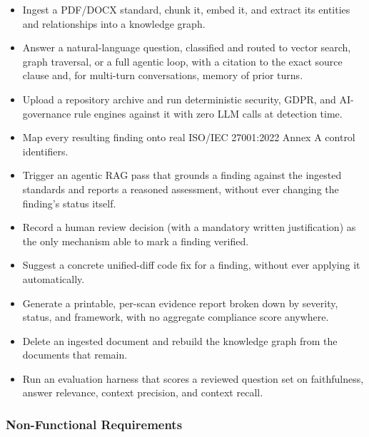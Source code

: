 \documentclass[12pt,a4paper]{report}
\begin{document}
\begin{itemize}
  \item Ingest a \ac{PDF}/DOCX standard, chunk it, embed it, and extract its
        entities and relationships into a knowledge graph.
  \item Answer a natural-language question, classified and routed to
        vector search, graph traversal, or a full agentic loop, with a
        citation to the exact source clause and, for multi-turn
        conversations, memory of prior turns.
  \item Upload a repository archive and run deterministic security,
        \ac{GDPR}, and AI-governance rule engines against it with zero
        \ac{LLM} calls at detection time.
  \item Map every resulting finding onto real ISO/IEC 27001:2022 Annex A
        control identifiers.
  \item Trigger an agentic \ac{RAG} pass that grounds a finding against the
        ingested standards and reports a reasoned assessment, without ever
        changing the finding's status itself.
  \item Record a human review decision (with a mandatory written
        justification) as the only mechanism able to mark a finding
        verified.
  \item Suggest a concrete unified-diff code fix for a finding, without
        ever applying it automatically.
  \item Generate a printable, per-scan evidence report broken down by
        severity, status, and framework, with no aggregate compliance score
        anywhere.
  \item Delete an ingested document and rebuild the knowledge graph from
        the documents that remain.
  \item Run an evaluation harness that scores a reviewed question set on
        faithfulness, answer relevance, context precision, and context
        recall.
\end{itemize}

\subsubsection{Non-Functional Requirements}
\end{document}
